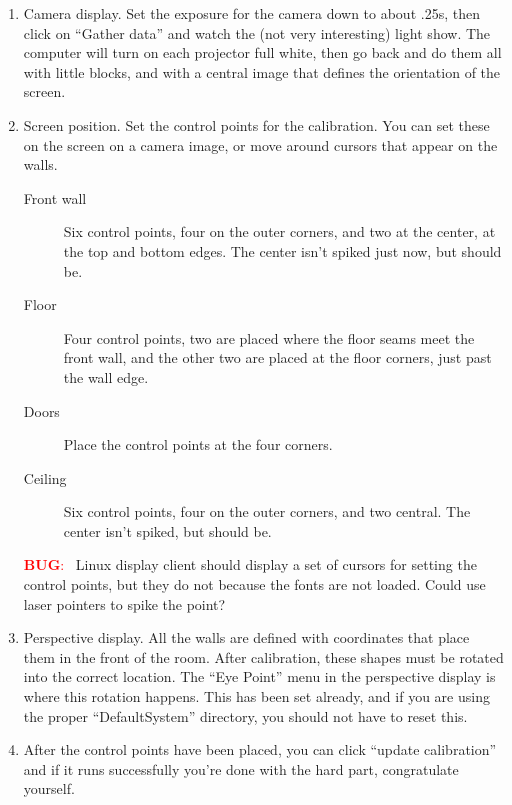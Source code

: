 \documentclass[11pt]{article}
\newenvironment{note}[1][Note]{\begin{lrbox}{\notebox}%
    \begin{minipage}{0.9\columnwidth}\textcolor{red}{\textbf{#1}:~}}%
    {\end{minipage}\end{lrbox}\begin{center}\setlength{\fboxsep}{8pt}%
    \fbox{\usebox{\notebox}}\end{center}}
\begin{document}
\begin{enumerate}
\item Camera display.  Set the exposure for the camera down to about
  .25s, then click on ``Gather data'' and watch the (not very
  interesting) light show.  The computer will turn on each projector
  full white, then go back and do them all with little blocks, and
  with a central image that defines the orientation of the
  screen.

\item Screen position.  Set the control points for the calibration.
  You can set these on the screen on a camera image, or move around
  cursors that appear on the walls.

  \begin{description}

  \item[Front wall] Six control points, four on the outer corners, and
    two at the center, at the top and bottom edges.  The center isn't
    spiked just now, but should be.

  \item[Floor] Four control points, two are placed where the floor
    seams meet the front wall, and the other two are placed at the
    floor corners, just past the wall edge.

  \item[Doors] Place the control points at the four corners.

  \item[Ceiling] Six control points, four on the outer corners, and
    two central.  The center isn't spiked, but should be.

  \end{description}

\begin{note}[BUG] Linux display client should display a set of cursors for
  setting the control points, but they do not because the fonts are
  not loaded.  Could use laser
  pointers to spike the point?
\end{note}

\item Perspective display.  All the walls are defined with coordinates
  that place them in the front of the room.  After calibration, these
  shapes must be rotated into the correct location.  The ``Eye Point''
  menu in the perspective display is where this rotation happens.
  This has been set already, and if you are using the proper
  ``DefaultSystem'' directory, you should not have to reset this.

\item After the control points have been placed, you can click
  ``update calibration'' and if it runs successfully you're done with
  the hard part, congratulate yourself.


\end{enumerate}
\end{document}
